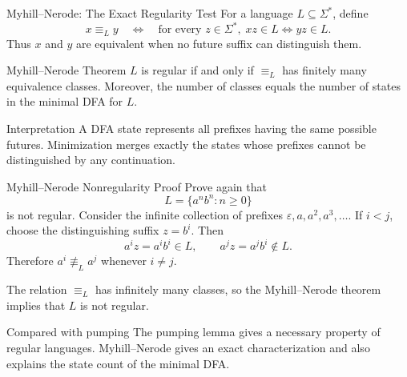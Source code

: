 \documentclass[10pt]{beamer}
\begin{document}
\begin{frame}{Myhill--Nerode: The Exact Regularity Test}
  \small
  For a language $L\subseteq\Sigma^*$, define
  \[
    x\equiv_L y
    \quad\Longleftrightarrow\quad
    \text{for every }z\in\Sigma^*,\;
    xz\in L\Longleftrightarrow yz\in L.
  \]
  Thus $x$ and $y$ are equivalent when no future suffix can distinguish
  them.
  \pause
  \begin{block}{Myhill--Nerode Theorem}
    $L$ is regular if and only if $\equiv_L$ has finitely many equivalence
    classes. Moreover, the number of classes equals the number of states in
    the minimal DFA for $L$.
  \end{block}
  \pause
  \begin{exampleblock}{Interpretation}
    A DFA state represents all prefixes having the same possible futures.
    Minimization merges exactly the states whose prefixes cannot be
    distinguished by any continuation.
  \end{exampleblock}
\end{frame}

\begin{frame}{Myhill--Nerode Nonregularity Proof}
  \small
  Prove again that
  \[
    L=\{a^n b^n:n\ge0\}
  \]
  is not regular.
  \pause
  Consider the infinite collection of prefixes
  $\varepsilon,a,a^2,a^3,\ldots$. If $i<j$, choose the distinguishing suffix
  $z=b^i$. Then
  \[
    a^i z=a^i b^i\in L,
    \qquad
    a^j z=a^j b^i\notin L.
  \]
  Therefore $a^i\not\equiv_L a^j$ whenever $i\ne j$.
  \pause

  The relation $\equiv_L$ has infinitely many classes, so the
  Myhill--Nerode theorem implies that $L$ is not regular.
  \begin{alertblock}{Compared with pumping}
    The pumping lemma gives a necessary property of regular languages.
    Myhill--Nerode gives an exact characterization and also explains the
    state count of the minimal DFA.
  \end{alertblock}
\end{frame}
\end{document}
